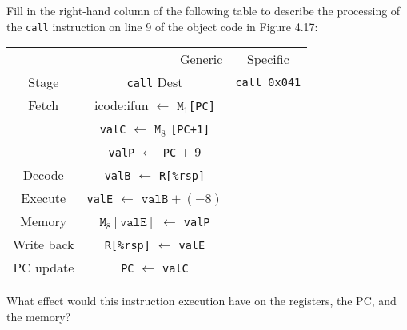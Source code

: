 \documentclass[12pt]{article}
\newenvironment{ex}[2][Exercise]{\begin{trivlist}
		\item[\hskip \labelsep {\bfseries #1}\hskip \labelsep {\bfseries #2.}]}{\end{trivlist}}
\begin{document}
\begin{ex}{4.18}
	Fill in the right-hand column of the following table to describe the processing
	of the \texttt{call} instruction on line 9 of the object code in Figure 4.17:
	\begin{center}
		\begin{tabular}{ccc}
			\multicolumn{2}{r}{Generic} & Specific\\
			Stage & \texttt{call} Dest & \texttt{call 0x041}\\
			\hline
			Fetch & icode:ifun $\leftarrow$ $\texttt{M}_1$\texttt{[PC]}&{}\\
			{} & \texttt{valC} $\leftarrow$ $\texttt{M}_8$ \texttt{[PC+1]}& \\
			{} & \texttt{valP} $\leftarrow$ \texttt{PC} + 9 & {}\\
			Decode & \texttt{valB} $\leftarrow$ \texttt{R[\%rsp]} & {}\\
			Execute & \texttt{valE} $\leftarrow$ $\texttt{valB} + (-8)$ & {}\\
			Memory & $\texttt{M}_8[\texttt{valE}]$ $\leftarrow$ \texttt{valP} &{}\\
			Write back & \texttt{R[\%rsp]} $\leftarrow$ \texttt{valE} & {}\\
			PC update& \texttt{PC} $\leftarrow$ \texttt{valC} & {}
		\end{tabular}
	\end{center}
	What effect would this instruction execution have on the registers, the
	PC, and the memory?
\end{ex}
\end{document}
